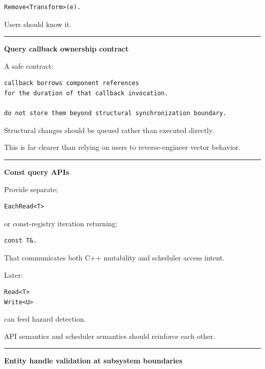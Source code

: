 \begin{verbatim}
Remove<Transform>(e).
\end{verbatim}

Users should know it.

\begin{center}\rule{0.5\linewidth}{0.5pt}\end{center}

\textbf{Query callback ownership contract}

A safe contract:

\begin{verbatim}
callback borrows component references
for the duration of that callback invocation.

do not store them beyond structural synchronization boundary.
\end{verbatim}

Structural changes should be queued rather than executed directly.

This is far clearer than relying on users to reverse-engineer vector behavior.

\begin{center}\rule{0.5\linewidth}{0.5pt}\end{center}

\textbf{Const query APIs}

Provide separate:

\begin{verbatim}
EachRead<T>
\end{verbatim}

or const-registry iteration returning:

\begin{verbatim}
const T&.
\end{verbatim}

That communicates both C++ mutability and scheduler access intent.

Later:

\begin{verbatim}
Read<T>
Write<U>
\end{verbatim}

can feed hazard detection.

API semantics and scheduler semantics should reinforce each other.

\begin{center}\rule{0.5\linewidth}{0.5pt}\end{center}

\textbf{Entity handle validation at subsystem boundaries}

